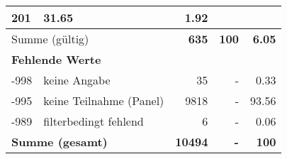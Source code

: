 \begin{longtable}{lXrrr}
       \num{201} &
       \num[round-mode=places,round-precision=2]{31.65} &
         \num[round-mode=places,round-precision=2]{1.92} \\
     \midrule
     \multicolumn{2}{l}{Summe (gültig)} &
       \textbf{\num{635}} &
     \textbf{\num{100}} &
       \textbf{\num[round-mode=places,round-precision=2]{6.05}} \\
     \multicolumn{5}{l}{\textbf{Fehlende Werte}}\\
       -998 &
       keine Angabe &
         \num{35} &
        - &
         \num[round-mode=places,round-precision=2]{0.33} \\
       -995 &
       keine Teilnahme (Panel) &
         \num{9818} &
        - &
         \num[round-mode=places,round-precision=2]{93.56} \\
       -989 &
       filterbedingt fehlend &
         \num{6} &
        - &
         \num[round-mode=places,round-precision=2]{0.06} \\
     \midrule
     \multicolumn{2}{l}{\textbf{Summe (gesamt)}} &
          \textbf{\num{10494}} &
        \textbf{-} &
        \textbf{\num{100}} \\
     \bottomrule
     \end{longtable}
     
